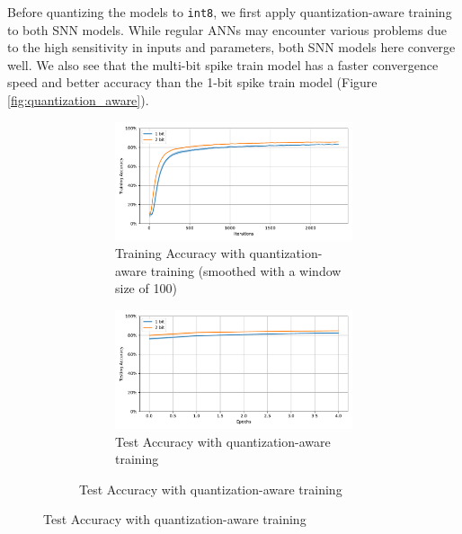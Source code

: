     Before quantizing the models to \verb|int8|, we first apply quantization-aware training to both SNN models. While regular ANNs may encounter various problems due to the high sensitivity in inputs and parameters, both SNN models here converge well. We also see that the multi-bit spike train model has a faster convergence speed and better accuracy than the 1-bit spike train model (Figure \ref{fig:quantization_aware}). 
    \begin{figure}[!htpb]
        \centering
        \begin{subfigure}[H]{\textwidth}
            \centering
            \begin{subfigure}[H]{\textwidth}
                \centering
                \includegraphics[width=\textwidth]{../quantized/FashionMNIST/plots/fashionmnist_train_acc.pdf}
                \caption{Training Accuracy with quantization-aware training (smoothed with a window size of 100)}
            \end{subfigure}
            \hfill
            \begin{subfigure}[H]{\textwidth}
                \centering
                \includegraphics[width=\textwidth]{../quantized/FashionMNIST/plots/fashionmnist_test_acc.pdf}
                \caption{Test Accuracy with quantization-aware training}

\end{subfigure}
\end{subfigure}
\end{figure}
